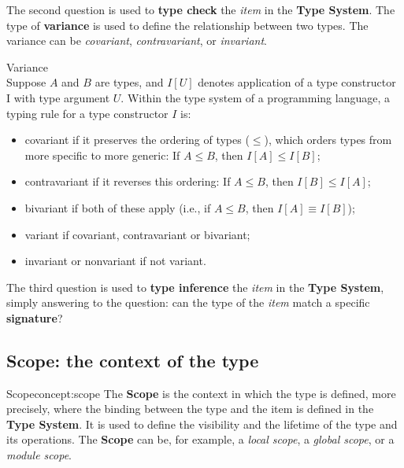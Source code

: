 The second question is used to \textbf{type check} the \textit{item} in the \textbf{Type System}. The type of \textbf{variance} is used to define the relationship between two types. The variance can be \textit{covariant}, \textit{contravariant}, or \textit{invariant}.

\begin{definition}{Variance}\\
    Suppose $A$ and $B$ are types, and $I[U]$ denotes application of a type constructor I with type argument $U$. Within the type system of a programming language, a typing rule for a type constructor $I$ is:
    \begin{itemize}
        \item covariant if it preserves the ordering of types ($\leq$), which orders types from more specific to more generic: If $A \leq B$, then $I[A] \leq I[B]$;
        \item contravariant if it reverses this ordering: If $A \leq B$, then $I[B] \leq I[A]$;
        \item bivariant if both of these apply (i.e., if $A \leq B$, then $I[A] \equiv I[B]$);
        \item variant if covariant, contravariant or bivariant;
        \item invariant or nonvariant if not variant.
    \end{itemize}
\end{definition}

The third question is used to \textbf{type inference} the \textit{item} in the \textbf{Type System}, simply answering to the question: can the type of the \textit{item} match a specific \textbf{signature}?


\subsection{Scope: the context of the type}\label{subsec:concept:ScopeTheContextOfTheType}


\begin{mydefinition}{Scope}{concept:scope}
The \textbf{Scope} is the context in which the type is defined, more precisely, where the binding between the type and the item is defined in the \textbf{Type System}. It is used to define the visibility and the lifetime of the type and its operations. The \textbf{Scope} can be, for example, a \textit{local scope}, a \textit{global scope}, or a \textit{module scope}.
\end{mydefinition}



